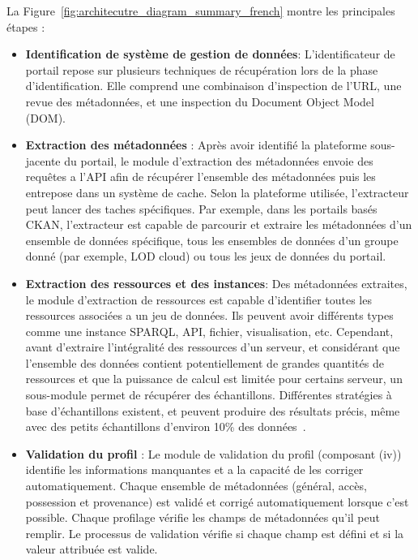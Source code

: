 La Figure~\ref{fig:architecutre_diagram_summary_french} montre les principales \'{e}tapes :

\begin{itemize}
	\item \textbf{Identification de syst\`{e}me de gestion de donn\'{e}es}: L'identificateur de portail repose sur plusieurs techniques de r\'{e}cup\'{e}ration lors de la phase d'identification. Elle comprend une combinaison d'inspection de l'URL, une revue des m\'{e}tadonn\'{e}es, et une inspection du Document Object Model (DOM).
	\item \textbf{Extraction des m\'{e}tadonn\'{e}es} : Apr\`{e}s avoir identifi\'{e} la plateforme sous-jacente du portail, le module d'extraction des m\'{e}tadonn\'{e}es envoie des requ\^{e}tes a l'API afin de r\'{e}cup\'{e}rer l’ensemble des m\'{e}tadonn\'{e}es puis les entrepose dans un syst\`{e}me de cache. Selon la plateforme utilis\'{e}e, l'extracteur peut lancer des taches sp\'{e}cifiques. Par exemple, dans les portails bas\'{e}s CKAN, l'extracteur est capable de parcourir et extraire les m\'{e}tadonn\'{e}es d'un ensemble de donn\'{e}es sp\'{e}cifique, tous les ensembles de donn\'{e}es d'un groupe donn\'{e} (par exemple, LOD cloud) ou tous les jeux de donn\'{e}es du portail.
	\item \textbf{Extraction des ressources et des instances}: Des m\'{e}tadonn\'{e}es extraites, le module d'extraction de ressources est capable d'identifier toutes les ressources associ\'{e}es a un jeu de donn\'{e}es. Ils peuvent avoir diff\'{e}rents types comme une instance SPARQL, API, fichier, visualisation, etc. Cependant, avant d'extraire l'int\'{e}gralit\'{e} des ressources d'un serveur, et consid\'{e}rant que l'ensemble des donn\'{e}es contient potentiellement de grandes quantit\'{e}s de ressources et que la puissance de calcul est limit\'{e}e pour certains serveur, un sous-module permet de r\'{e}cup\'{e}rer des \'{e}chantillons. Diff\'{e}rentes strat\'{e}gies \`{a} base d'\'{e}chantillons existent, et peuvent produire des r\'{e}sultats pr\'{e}cis, m\^{e}me avec des petits \'{e}chantillons d'environ 10\% des donn\'{e}es~\cite{Fetahu:ESWC:14}.
	\item \textbf{Validation du profil} : Le module de validation du profil (composant (iv)) identifie les informations manquantes et a la capacit\'{e} de les corriger automatiquement. Chaque ensemble de m\'{e}tadonn\'{e}es (g\'{e}n\'{e}ral, acc\`{e}s, possession et provenance) est valid\'{e} et corrig\'{e} automatiquement lorsque c'est possible. Chaque profilage v\'{e}rifie les champs de m\'{e}tadonn\'{e}es qu'il peut remplir. Le processus de validation v\'{e}rifie si chaque champ est d\'{e}fini et si la valeur attribu\'{e}e est valide.


\end{itemize}
